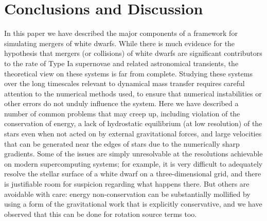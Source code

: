 \documentclass[iop]{../emulateapj}
\begin{document}
\section{Conclusions and Discussion}\label{sec:Conclusions and Discussion}

In this paper we have described the major components of a framework for 
simulating mergers of white dwarfs. While there is much evidence for the 
hypothesis that mergers (or collisions) of white dwarfs are significant 
contributors to the rate of Type Ia supernovae and related astronomical 
transients, the theoretical view on these systems is far from complete. 
Studying these systems over the long timescales relevant to dynamical 
mass transfer requires careful attention to the numerical methods used, 
to ensure that numerical instabilities or other errors do not unduly 
influence the system. Here we have described a number of common problems
that may creep up, including violation of the conservation of energy, 
a lack of hydrostatic equilibrium (at low resolution) of the stars 
even when not acted on by external gravitational forces, and large 
velocities that can be generated near the edges of stars due to the 
numerically sharp gradients. Some of the issues are simply unresolvable
at the resolutions achievable on modern supercomputing systems; 
for example, it is very difficult to adequately resolve the stellar 
surface of a white dwarf on a three-dimensional grid, and there is 
justifiable room for suspicion regarding what happens there. But others
are avoidable with care: energy non-conservation can be substantially 
mollified by using a form of the gravitational work that is explicitly 
conservative, and we have observed that this can be done for rotation 
source terms too.
\end{document}

